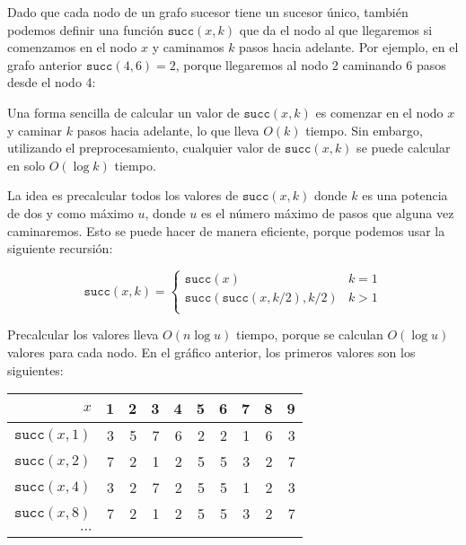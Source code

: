 Dado que cada nodo de un grafo sucesor tiene un
sucesor único, también podemos definir una función $\texttt{succ}(x,k)$
que da el nodo al que llegaremos si
comenzamos en el nodo $x$ y caminamos $k$ pasos hacia adelante.
Por ejemplo, en el grafo anterior $\texttt{succ}(4,6)=2$,
porque llegaremos al nodo 2 caminando 6 pasos desde el nodo 4:


\begin{center}
\end{center}

Una forma sencilla de calcular un valor de $\texttt{succ}(x,k)$
es comenzar en el nodo $x$ y caminar $k$ pasos hacia adelante, lo que lleva $O(k)$ tiempo.
Sin embargo, utilizando el preprocesamiento, cualquier valor de $\texttt{succ}(x,k)$
se puede calcular en solo $O(\log k)$ tiempo.

La idea es precalcular todos los valores de $\texttt{succ}(x,k)$ donde
$k$ es una potencia de dos y como máximo $u$, donde $u$ es
el número máximo de pasos que alguna vez caminaremos.
Esto se puede hacer de manera eficiente, porque
podemos usar la siguiente recursión:

\begin{equation*}
    \texttt{succ}(x,k) = \begin{cases}
               \texttt{succ}(x)              & k = 1\\
               \texttt{succ}(\texttt{succ}(x,k/2),k/2)   & k > 1\\
           \end{cases}
\end{equation*}

Precalcular los valores lleva $O(n \log u)$ tiempo,
porque se calculan $O(\log u)$ valores para cada nodo.
En el gráfico anterior, los primeros valores son los siguientes:

\begin{center}
\begin{tabular}{r|rrrrrrrrr}
$x$ & 1 & 2 & 3 & 4 & 5 & 6 & 7 & 8 & 9 \\
\hline
$\texttt{succ}(x,1)$ & 3 & 5 & 7 & 6 & 2 & 2 & 1 & 6 & 3 \\
$\texttt{succ}(x,2)$ & 7 & 2 & 1 & 2 & 5 & 5 & 3 & 2 & 7 \\
$\texttt{succ}(x,4)$ & 3 & 2 & 7 & 2 & 5 & 5 & 1 & 2 & 3 \\
$\texttt{succ}(x,8)$ & 7 & 2 & 1 & 2 & 5 & 5 & 3 & 2 & 7 \\
$\cdots$ \\
\end{tabular}
\end{center}

